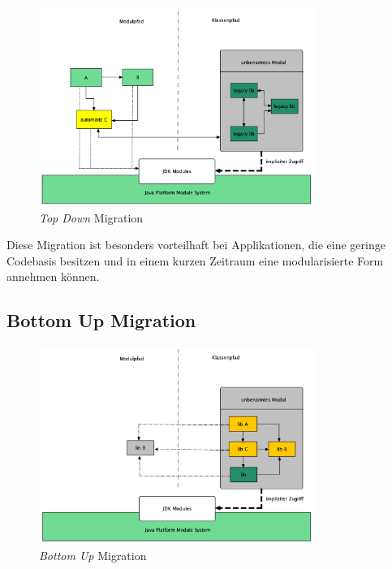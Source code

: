 	\begin{figure}[h]
		\centering
	    \includegraphics[width=0.8\textwidth]{material/images/top-down-migration.png}
	    \caption{\textit{Top Down} Migration}
	    \label{fig:TDM}
  	\end{figure}

	Diese Migration ist besonders vorteilhaft bei Applikationen, die eine geringe Codebasis besitzen und in einem kurzen Zeitraum eine modularisierte Form annehmen können. 


\subsection{Bottom Up Migration} \label{sec:bottomUP}

	\begin{figure}[h]
		\centering
	    \includegraphics[width=0.8\textwidth]{material/images/bottom-up-migration.png}
	    \caption{\textit{Bottom Up} Migration}
	    \label{fig:BUM}
  	\end{figure}

